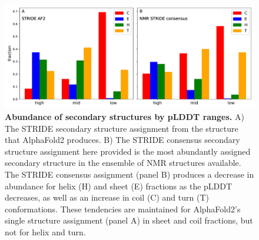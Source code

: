 \begin{figure}[H]
    \centering
    \includegraphics[width=\textwidth]{pLDDT/plddt_figures/barplot_plddt_regions_per_ss_type_abundance_only_normalised_af_stride_af_ss_nmr_strideCons.pdf}
    \caption{\textbf{Abundance of secondary structures by pLDDT ranges.} A) The STRIDE secondary structure assignment from the structure that AlphaFold2 produces. B) The STRIDE consensus secondary structure assignment here provided is the most abundantly assigned secondary structure in the ensemble of NMR structures available. The STRIDE consensus assignment (panel B) produces a decrease in abundance for helix (H) and sheet (E) fractions as the pLDDT decreases, as well as an increase in coil (C) and turn (T) conformations. These tendencies are maintained for AlphaFold2's single structure assignment (panel A) in sheet and coil fractions, but not for helix and turn.}
    \label{fig:ss_barplots_normalised}
\end{figure}




